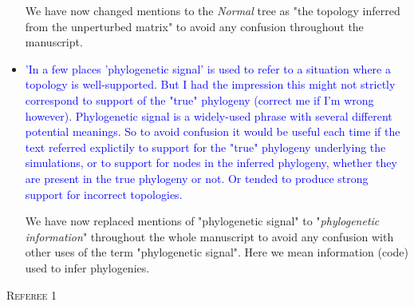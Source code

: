 \documentclass[12pt,letterpaper]{article}
\renewcommand{\section}[1]{%
\bigskip
\begin{center}
\begin{Large}
\normalfont\scshape #1
\medskip
\end{Large}
\end{center}}
\begin{document}
\begin{itemize}
We have now changed mentions to the \textit{Normal} tree as "the topology inferred from the unperturbed matrix" to avoid any confusion throughout the manuscript.



\item{\textcolor{blue}{'In a few places 'phylogenetic signal' is used to refer to a situation where a topology is well-supported. But I had the impression this might not strictly correspond to support of the "true" phylogeny (correct me if I'm wrong however). Phylogenetic signal is a widely-used phrase with several different potential meanings. So to avoid confusion it would be useful each time if the text referred explictily to support for the "true" phylogeny underlying the simulations, or to support for nodes in the inferred phylogeny, whether they are present in the true phylogeny or not. Or tended to produce strong support for incorrect topologies.}}

We have now replaced mentions of "phylogenetic signal" to "\textit{phylogenetic information}" throughout the whole manuscript to avoid any confusion with other uses of the term "phylogenetic signal". Here we mean information (code) used to infer phylogenies.

\end{itemize}












\section{Referee 1}
\end{document}
